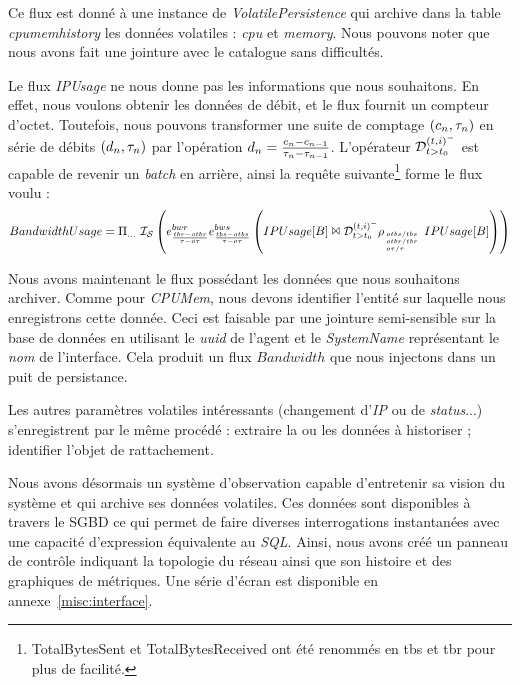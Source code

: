 Ce flux est donné à une instance de \textit{VolatilePersistence} qui archive dans la table \textit{cpumemhistory} les données volatiles : \textit{cpu} et \textit{memory}. Nous pouvons noter que nous avons fait une jointure avec le catalogue sans difficultés.

Le flux \textit{IPUsage} ne nous donne pas les informations que nous souhaitons. En effet, nous voulons obtenir les données de débit, et le flux fournit un compteur d'octet. Toutefois, nous pouvons transformer une suite de comptage $(c_n,\tau_n)$ en série de débits $(d_n,\tau_n)$ par l'opération $d_n=\frac{c_n-c_{n-1}}{\tau_n-\tau_{n-1}}$. L'opérateur $\mathcal{D}_{t>t_0}^{(t,i)^-}$ est capable de revenir un \textit{batch} en arrière, ainsi la requête suivante\footnote{TotalBytesSent et TotalBytesReceived ont été renommés en tbs et tbr pour plus de facilité.} forme le flux voulu :
$$BandwidthUsage = \Pi_{...}\ \mathcal{I_S} \left( e_{\frac{tbr-otbr}{\tau-o\tau}}^{bwr} e_{\frac{tbs-otbs}{\tau-o\tau}}^{bws}\left(IPUsage[B] \Join \mathcal{D}_{t>t_0}^{(t,i)^-} \rho_{\hspace{-0.33em}\mbox{\tiny $\begin{array}{l} otbs/tbs\\otbr/tbr\\ o\tau/\tau\end{array}$}}IPUsage[B]\right)\right)$$

Nous avons maintenant le flux possédant les données que nous souhaitons archiver. Comme pour \textit{CPUMem}, nous devons identifier l'entité sur laquelle nous enregistrons cette donnée. Ceci est faisable par une jointure semi-sensible sur la base de données en utilisant le \textit{uuid} de l'agent et le \textit{SystemName} représentant le \textit{nom} de l'interface. Cela produit un flux $Bandwidth$ que nous injectons dans un puit de persistance.

Les autres paramètres volatiles intéressants (changement d'\textit{IP} ou de \textit{status}...) s'enregistrent par le même procédé : extraire la ou les données à historiser ; identifier l'objet de rattachement.

Nous avons désormais un système d'observation capable d'entretenir sa vision du système et qui archive ses données volatiles. Ces données sont disponibles à travers le SGBD ce qui permet de faire diverses interrogations instantanées avec une capacité d'expression équivalente au \textit{SQL}. Ainsi, nous avons créé un panneau de contrôle indiquant la topologie du réseau ainsi que son histoire et des graphiques de métriques. Une série d'écran est disponible en annexe~\ref{misc:interface}.

